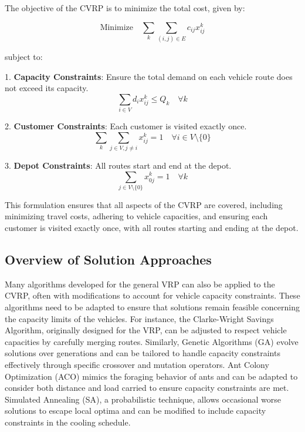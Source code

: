 \documentclass[
]{article}
\begin{document}
    The objective of the CVRP is to minimize the total cost, given by:

    \begin{equation}
        \text{Minimize} \quad \sum_{k} \sum_{(i,j) \in E} c_{ij} x_{ij}^k
    \end{equation}

    subject to:

    1. \textbf{Capacity Constraints}: Ensure the total demand on each vehicle route does not exceed its capacity.
    \begin{equation}
        \sum_{i \in V} d_i x_{ij}^k \leq Q_k \quad \forall k
    \end{equation}

    2. \textbf{Customer Constraints}: Each customer is visited exactly once.
    \begin{equation}
        \sum_{k} \sum_{j \in V, j \neq i} x_{ij}^k = 1 \quad \forall i \in V \setminus \{0\}
    \end{equation}

    3. \textbf{Depot Constraints}: All routes start and end at the depot.
    \begin{equation}
        \sum_{j \in V \setminus \{0\}} x_{0j}^k = 1 \quad \forall k
    \end{equation}

    This formulation ensures that all aspects of the CVRP are covered, including minimizing travel costs, adhering to vehicle capacities, and ensuring each customer is visited exactly once, with all routes starting and ending at the depot.

    \subsection{Overview of Solution Approaches}\label{subsec:overview-of-solution-approaches}

    Many algorithms developed for the general VRP can also be applied to the CVRP, often with modifications to account for vehicle capacity constraints. These algorithms need to be adapted to ensure that solutions remain feasible concerning the capacity limits of the vehicles. For instance, the Clarke-Wright Savings Algorithm, originally designed for the VRP, can be adjusted to respect vehicle capacities by carefully merging routes. Similarly, Genetic Algorithms (GA) evolve solutions over generations and can be tailored to handle capacity constraints effectively through specific crossover and mutation operators. Ant Colony Optimization (ACO) mimics the foraging behavior of ants and can be adapted to consider both distance and load carried to ensure capacity constraints are met. Simulated Annealing (SA), a probabilistic technique, allows occasional worse solutions to escape local optima and can be modified to include capacity constraints in the cooling schedule.
\end{document}
